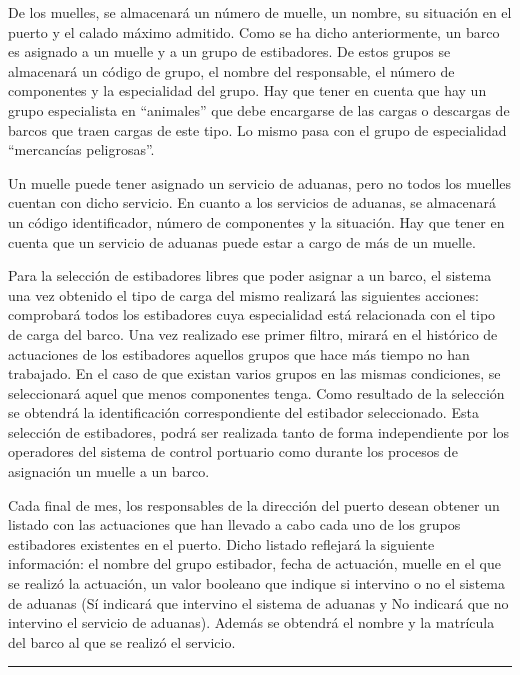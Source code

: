 \documentclass[a4paper]{article}
\begin{document}
De los muelles, se almacenará un número de muelle, un nombre, su situación en el puerto y el calado máximo admitido. Como se ha dicho anteriormente, un barco es asignado a un muelle y a un grupo de estibadores. De estos grupos se almacenará un código de grupo, el nombre del responsable, el número de componentes y la especialidad del grupo. Hay que tener en cuenta que hay un grupo especialista en “animales” que debe encargarse de las cargas o descargas de barcos que traen cargas de este tipo. Lo mismo pasa con el grupo de especialidad “mercancías peligrosas”.

Un muelle puede tener asignado un servicio de aduanas, pero no todos los muelles cuentan con dicho servicio. En cuanto a los servicios de aduanas, se almacenará un código identificador, número de componentes y la situación. Hay que tener en cuenta que un servicio de aduanas puede estar a cargo de más de un muelle.

Para la selección de estibadores libres que poder asignar a un barco, el sistema una vez obtenido el tipo de carga del mismo realizará las siguientes acciones: comprobará todos los estibadores cuya especialidad está relacionada con el tipo de carga del barco. Una vez realizado ese primer filtro, mirará en el histórico de actuaciones de los estibadores aquellos grupos que hace más tiempo no han trabajado. En el caso de que existan varios grupos en las mismas condiciones, se seleccionará aquel que menos componentes tenga. Como resultado de la selección se obtendrá la identificación correspondiente del estibador seleccionado. Esta selección de estibadores, podrá ser realizada tanto de forma independiente por los operadores del sistema de control portuario como durante los procesos de asignación un muelle a un barco.

Cada final de mes, los responsables de la dirección del puerto desean obtener un listado con las actuaciones que han llevado a cabo cada uno de los grupos estibadores existentes en el puerto. Dicho listado reflejará la siguiente información: el nombre del grupo estibador, fecha de actuación, muelle en el que se realizó la actuación, un valor booleano que indique si intervino o no el sistema de aduanas (Sí indicará que intervino el sistema de aduanas y No indicará que no intervino el servicio de aduanas). Además se obtendrá el nombre y la matrícula del barco al que se realizó el servicio.

\vspace{2em}
\hrule
\doclicenseThis
\end{document}
